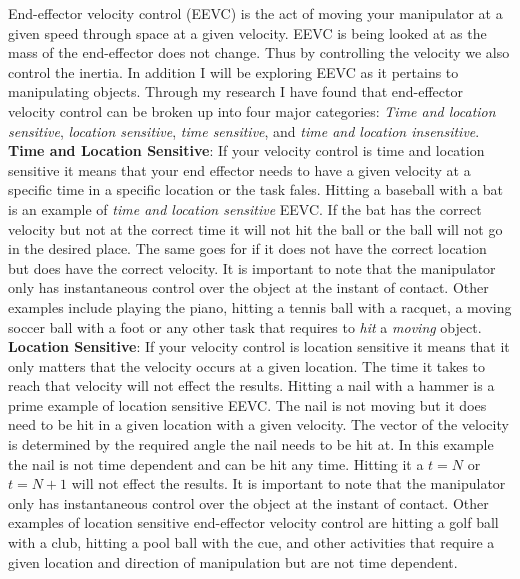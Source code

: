 End-effector velocity control (EEVC) is the act of moving your manipulator at a given speed through space at a given velocity.
EEVC is being looked at as the mass of the end-effector does not change.
Thus by controlling the velocity we also control the inertia.
In addition I will be exploring EEVC as it pertains to manipulating objects.
Through my research I have found that end-effector velocity control can be broken up into four major categories:
\textit{Time and location sensitive}, \textit{location sensitive}, \textit{time sensitive}, and \textit{time and location insensitive}.\\


\noindent \textbf{Time and Location Sensitive}: 
If your velocity control is time and location sensitive it means that your end effector needs to have a given velocity at a specific time in a specific location or the task fales.
Hitting a baseball with a bat is an example of \textit{time and location sensitive}  EEVC.
If the bat has the correct velocity but not at the correct time it will not hit the ball or the ball will not go in the desired place.  
The same goes for if it does not have the correct location but does have the correct velocity.
It is important to note that the manipulator only has instantaneous control over the object at the instant of contact.
Other examples include playing the piano, hitting a tennis ball with a racquet, a moving soccer ball with a foot or any other task that requires to \textit{hit} a \textit{moving} object.\\


\noindent \textbf{Location Sensitive}:
If your velocity control is location sensitive it means that it only matters that the velocity occurs at a given location.
The time it takes to reach that velocity will not effect the results.
Hitting a nail with a hammer is a prime example of location sensitive EEVC.  
The nail is not moving but it does need to be hit in a given location with a given velocity.
The vector of the velocity is determined by the required angle the nail needs to be hit at.
In this example the nail is not time dependent and can be hit any time.
Hitting it a $t=N$ or $t=N+1$ will not effect the results.
It is important to note that the manipulator only has instantaneous control over the object at the instant of contact.
Other examples of location sensitive end-effector velocity control are hitting a golf ball with a club, hitting a pool ball with the cue, and other activities that require a given location and direction of manipulation but are not time dependent.\\


